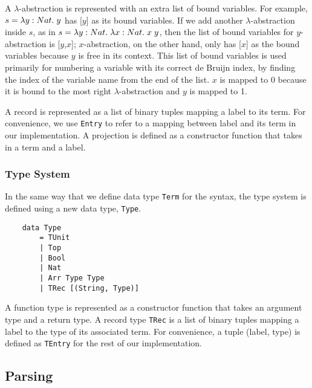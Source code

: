 \documentclass[fleqn, 11pt]{article}
\begin{document}
A $\lambda$-abstraction is represented with an extra list of bound variables. For example, $s = \lambda y:Nat . \hspace{1mm} y$ has 
[$y$] as its bound variables. If we add another $\lambda$-abstraction inside $s$, as in 
$s = \lambda y:Nat . \hspace{1mm} \lambda x:Nat . \hspace{1mm} x \hspace{1mm} y$, then the list of bound variables for $y$-
abstraction is [$y$,$x$]; $x$-abstraction, on the other hand, only has [$x$] as the bound variables because $y$ is free 
in its context. This list of bound variables is used primarily for numbering a variable with its correct de Bruijn index, by finding the 
index of the variable name from the end of the list. $x$ is mapped to 0 because it is bound to the most right $\lambda$-abstraction and 
$y$ is mapped to 1.

A record is represented as a list of binary tuples mapping a label to its term. For convenience, we use \texttt{Entry} to refer to 
a mapping between label and its term in our implementation. A projection is defined as a constructor function that 
takes in a term and a label.

\subsubsection{Type System}

In the same way that we define data type \texttt{Term} for the syntax, the type system is defined using a new data type, \texttt{Type}.

\begin{Verbatim}
    data Type 
        = TUnit                  
        | Top                    
        | Bool                   
        | Nat                    
        | Arr Type Type          
        | TRec [(String, Type)]                                            
\end{Verbatim}

A function type is represented as a constructor function that takes an argument type and a return type. A record type \texttt{TRec} is a list
of binary tuples mapping a label to the type of its associated term. For convenience, a tuple (label, type) is defined as \texttt{TEntry} 
for the rest of our implementation. 

\subsection{Parsing}
\end{document}
